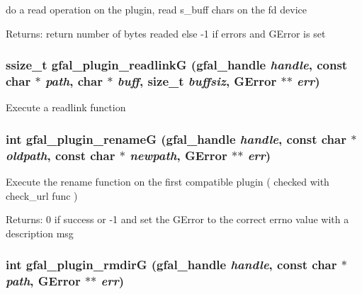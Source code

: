 do a read operation on the plugin, read s\_\-buff chars on the fd device \begin{Desc}
\item[Returns:]return number of bytes readed else -1 if errors and GError is set \end{Desc}
\subsubsection{\setlength{\rightskip}{0pt plus 5cm}ssize\_\-t gfal\_\-plugin\_\-readlink\-G (gfal\_\-handle {\em handle}, const char $\ast$ {\em path}, char $\ast$ {\em buff}, size\_\-t {\em buffsiz}, GError $\ast$$\ast$ {\em err})}\label{gfal__common__plugin_8h_d2e6e573b52926185793ff4f0dd5e307}


Execute a readlink function 
\subsubsection{\setlength{\rightskip}{0pt plus 5cm}int gfal\_\-plugin\_\-rename\-G (gfal\_\-handle {\em handle}, const char $\ast$ {\em oldpath}, const char $\ast$ {\em newpath}, GError $\ast$$\ast$ {\em err})}\label{gfal__common__plugin_8h_ee26850796f50439ded98dafc7cd064b}


Execute the rename function on the first compatible plugin ( checked with check\_\-url func ) \begin{Desc}
\item[Returns:]0 if success or -1 and set the GError to the correct errno value with a description msg \end{Desc}
\subsubsection{\setlength{\rightskip}{0pt plus 5cm}int gfal\_\-plugin\_\-rmdir\-G (gfal\_\-handle {\em handle}, const char $\ast$ {\em path}, GError $\ast$$\ast$ {\em err})}\label{gfal__common__plugin_8h_d3bcfafdf8d90935cb312388cdd6bb92}



